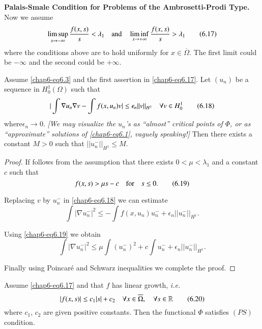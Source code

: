 \noindent
{\bf Palais-Smale Condition for Problems of the Ambrosetti-Prodi
  Type.} Now we assume
\begin{equation*}
\mathop{\lim\sup}\limits_{s\to
  -\infty}\frac{f(x,s)}{s}<\lambda_{1}\quad\text{and}\quad
\mathop{\lim\inf}\limits_{s\to
  +\infty}\frac{f(x,s)}{s}>\lambda_{1}\tag{6.17}\label{chap6-eq6.17} 
\end{equation*}
where the conditions above are to hold uniformly for $x\in
\overline{\Omega}$. The first limit could be $-\infty$ and the second
could be $+\infty$.

\begin{lemma}\label{chap6-lem6.5}
Assume \eqref{chap6-eq6.3} and the first assertion in
\eqref{chap6-eq6.17}. Let $(u_{n})$ be a sequence in
$H^{1}_{0}(\Omega)$ such that
\begin{equation*}
|\int\nabla u_{n}\nabla v-\int f(x,u_{n})v|\leq
\epsilon_{n}||v||_{H^{1}}\quad \forall v\in
H^{1}_{0}\tag{6.18}\label{chap6-eq6.18} 
\end{equation*}
where\pageoriginale $\epsilon_{n}\to 0$. {\em [We may visualize the
    $u_{n}$'s as ``almost'' critical points of $\Phi$, or as
    ``approximate'' solutions of \eqref{chap6-eq6.1}, vaguely
    speaking!]} Then there exists a constant $M>0$ such that
$||u^{-}_{n}||_{H^{1}}\leq M$. 
\end{lemma}

\begin{proof}
If follows from the assumption that there exists $0<\mu<\lambda_{1}$
and a constant $c$ such that
\begin{equation*}
f(x,s)>\mu s-c\quad\text{for}\quad s\leq 0.\tag{6.19}\label{chap6-eq6.19} 
\end{equation*}

Replacing $v$ by $u^{-}_{n}$ in \eqref{chap6-eq6.18} we can estimate
$$
\int |\nabla u^{-}_{n}|^{2}\leq -\int
f(x,u_{n})u^{-}_{n}+\epsilon_{n}||u^{-}_{n}||_{H^{1}}. 
$$

Using \eqref{chap6-eq6.19} we obtain
$$
\int |\nabla u^{-}_{n}|^{2}\leq \mu \int (u^{-}_{n})^{2}+c\int
u^{-}_{n}+\epsilon_{n}||u^{-}_{n}||_{H^{1}}. 
$$

Finally using Poincar\'e and Schwarz inequalities we complete the proof.
\end{proof}

\begin{lemma}\label{chap6-lem6.6}
Assume \eqref{chap6-eq6.17} and that $f$ has linear growth, {\em i.e.}
\begin{equation*}
|f(x,s)|\leq c_{1}|s|+c_{2}\quad \forall x\in \overline{\Omega},\quad
\forall s\in \mathbb{R}\tag{6.20}\label{chap6-eq6.20} 
\end{equation*}
where $c_{1}$, $c_{2}$ are given positive constants. Then the
functional $\Phi$ satisfies $(PS)$ condition. 
\end{lemma}

